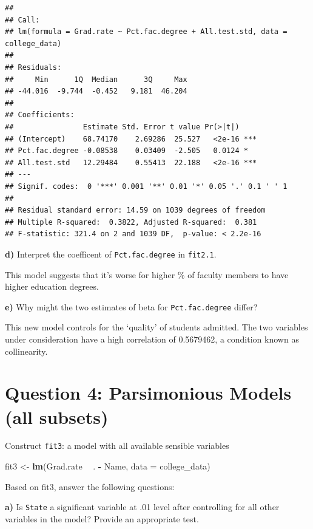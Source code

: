 \documentclass[]{article}
\newenvironment{Shaded}{\begin{snugshade}}{\end{snugshade}}
\newcommand{\KeywordTok}[1]{\textcolor[rgb]{0.13,0.29,0.53}{\textbf{#1}}}
\newcommand{\DataTypeTok}[1]{\textcolor[rgb]{0.13,0.29,0.53}{#1}}
\newcommand{\StringTok}[1]{\textcolor[rgb]{0.31,0.60,0.02}{#1}}
\newcommand{\OperatorTok}[1]{\textcolor[rgb]{0.81,0.36,0.00}{\textbf{#1}}}
\newcommand{\NormalTok}[1]{#1}
\begin{document}
\begin{verbatim}
## 
## Call:
## lm(formula = Grad.rate ~ Pct.fac.degree + All.test.std, data = college_data)
## 
## Residuals:
##     Min      1Q  Median      3Q     Max 
## -44.016  -9.744  -0.452   9.181  46.204 
## 
## Coefficients:
##                Estimate Std. Error t value Pr(>|t|)    
## (Intercept)    68.74170    2.69286  25.527   <2e-16 ***
## Pct.fac.degree -0.08538    0.03409  -2.505   0.0124 *  
## All.test.std   12.29484    0.55413  22.188   <2e-16 ***
## ---
## Signif. codes:  0 '***' 0.001 '**' 0.01 '*' 0.05 '.' 0.1 ' ' 1
## 
## Residual standard error: 14.59 on 1039 degrees of freedom
## Multiple R-squared:  0.3822, Adjusted R-squared:  0.381 
## F-statistic: 321.4 on 2 and 1039 DF,  p-value: < 2.2e-16
\end{verbatim}

\textbf{d)} Interpret the coefficent of \texttt{Pct.fac.degree} in
\texttt{fit2.1}.

This model suggests that it's worse for higher \% of faculty members to
have higher education degrees.

\textbf{e)} Why might the two estimates of beta for
\texttt{Pct.fac.degree} differ?

This new model controls for the `quality' of students admitted. The two
variables under consideration have a high correlation of 0.5679462, a
condition known as collinearity.

\section{Question 4: Parsimonious Models (all
subsets)}\label{question-4-parsimonious-models-all-subsets}

Construct \texttt{fit3}: a model with all available sensible variables

\begin{Shaded}
\begin{Highlighting}[]
\NormalTok{fit3 <-}\StringTok{ }\KeywordTok{lm}\NormalTok{(Grad.rate }\OperatorTok{~}\StringTok{ }\NormalTok{. }\OperatorTok{-}\StringTok{ }\NormalTok{Name, }\DataTypeTok{data =}\NormalTok{ college_data)}
\end{Highlighting}
\end{Shaded}

Based on fit3, answer the following questions:

\textbf{a)} Is \texttt{State} a significant variable at .01 level after
controlling for all other variables in the model? Provide an appropriate
test.
\end{document}
